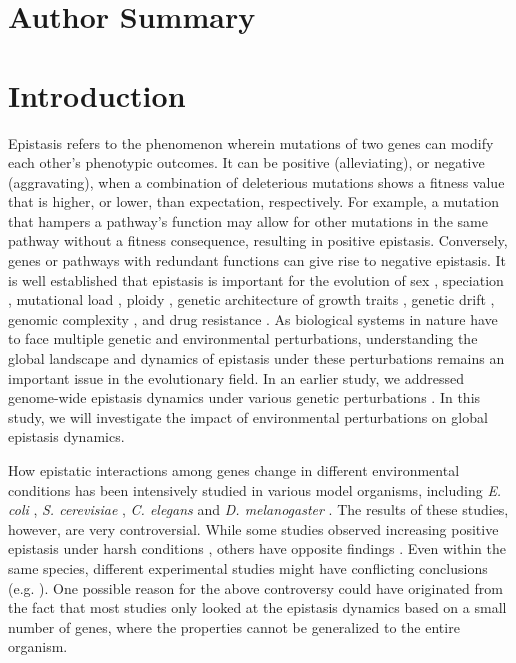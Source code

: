 \section{Author Summary} 
\epistasisEnviroAuthorSummary

\section{Introduction}

Epistasis refers to the phenomenon wherein mutations of two genes can
modify each other’s phenotypic outcomes. It can be positive
(alleviating), or negative (aggravating), when a combination of
deleterious mutations shows a fitness value that is higher, or lower,
than expectation, respectively. For example, a mutation that hampers a
pathway's function may allow for other mutations in the same pathway
without a fitness consequence, resulting in positive
epistasis. Conversely, genes or pathways with redundant functions can
give rise to negative epistasis. It is well established that epistasis
is important for the evolution of sex \citep{Kondrashov1982,
Azevedo2006, Otto2007}, speciation \citep{Presgraves2007}, mutational
load \citep{Hansen2001}, ploidy \citep{Musso2008}, genetic
architecture of growth traits \citep{Xu2011}, genetic drift
\citep{Perez-Figueroa2009}, genomic complexity \citep{Sanjuan2008},
and drug resistance \citep{Trindade2009}. As biological systems in
nature have to face multiple genetic
and environmental perturbations, understanding the global landscape
and dynamics of epistasis under these perturbations remains an
important issue in the evolutionary field. In an earlier study, we
addressed genome-wide epistasis dynamics under various genetic
perturbations \citep{Xu2012}. In this study, we will investigate the impact of
environmental perturbations on global epistasis dynamics.

How epistatic interactions among genes change in different
environmental conditions has been intensively studied in various model
organisms, including \textit{E. coli} \citep{Remold2001,
Kishony2003, Cooper2005}, \textit{S. cerevisiae} \citep{Korona1999,
Szafraniec2001, Jasnos2008}, \textit{C. elegans}
\citep{Vassilieva2000, Baer2006} and \textit{D. melanogaster}
\citep{Yang2001, Fry2002, AletheaD.Wang2009}. The results of these
studies, however, are very controversial. While some studies observed
increasing positive epistasis under harsh conditions
\citep{Kishony2003, Jasnos2008, Yang2001}, others have opposite
findings \citep{Cooper2005, Korona1999, Szafraniec2001, Vassilieva2000,
Baer2006, Fry2002, AletheaD.Wang2009, Young2009}. Even within the same
species, different experimental studies might have conflicting
conclusions (e.g. \citealt{Kishony2003, Cooper2005}). One possible
reason for the above controversy could have
originated from the fact that most studies only looked at the
epistasis dynamics based on a small number of genes, where the
properties cannot be generalized to the entire organism.

